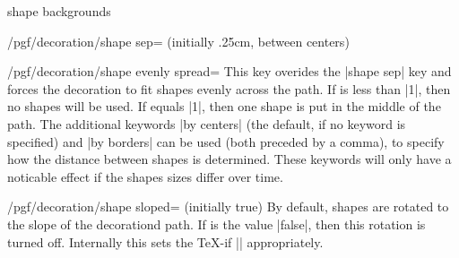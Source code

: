 \begin{decoration}{shape backgrounds}
\begin{key}{/pgf/decoration/shape sep= (initially {.25cm, between centers})}
\begin{codeexample}[]
\end{codeexample}
  \end{key}
  
  \begin{key}{/pgf/decoration/shape evenly spread=}
    This key overides the |shape sep| key and forces the decoration to
    fit  shapes evenly across the path. 
    If  is less than |1|, then no shapes will be used. 
    If  equals |1|, then one shape is put in the middle 
    of the path. 
    The additional keywords |by centers| (the default, if no keyword is
    specified) and |by borders| can be used (both preceded by a comma), 
    to specify how the distance between shapes is determined. These
    keywords will only have a noticable effect if the shapes sizes
    differ over time.
    
\begin{codeexample}[]
\end{codeexample}
  \end{key}

  \begin{key}{/pgf/decoration/shape sloped= (initially true)}
    By default, shapes are rotated to the slope of the decorationd path. If 
     is the value |false|, then this rotation is turned 
    off. Internally this sets the \TeX-if |\ifpgfshapedecorationsloped|
    appropriately.


\end{key}
\end{decoration}
